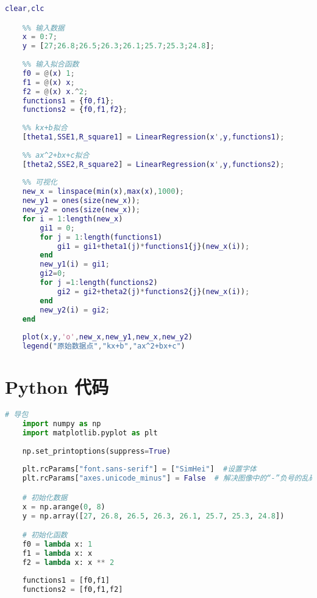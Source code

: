 \documentclass[withoutpreface]{cumcmthesis}
\begin{document}
    \begin{lstlisting}[language=matlab ,caption={一次函数和二次函数拟合比较} ]
    clear,clc

    %% 输入数据
    x = 0:7;
    y = [27;26.8;26.5;26.3;26.1;25.7;25.3;24.8];
    
    %% 输入拟合函数
    f0 = @(x) 1;
    f1 = @(x) x;
    f2 = @(x) x.^2;
    functions1 = {f0,f1};
    functions2 = {f0,f1,f2};
    
    %% kx+b拟合
    [theta1,SSE1,R_square1] = LinearRegression(x',y,functions1);
    
    %% ax^2+bx+c拟合
    [theta2,SSE2,R_square2] = LinearRegression(x',y,functions2);
    
    %% 可视化
    new_x = linspace(min(x),max(x),1000);
    new_y1 = ones(size(new_x));
    new_y2 = ones(size(new_x));
    for i = 1:length(new_x)
        gi1 = 0;
        for j = 1:length(functions1)
            gi1 = gi1+theta1(j)*functions1{j}(new_x(i));
        end
        new_y1(i) = gi1;
        gi2=0;
        for j =1:length(functions2)
            gi2 = gi2+theta2(j)*functions2{j}(new_x(i));
        end
        new_y2(i) = gi2;
    end
    
    plot(x,y,'o',new_x,new_y1,new_x,new_y2)
    legend("原始数据点","kx+b","ax^2+bx+c")
    \end{lstlisting}
\section{Python 代码}

    \begin{lstlisting}[language=python ,caption={初始化} ]
    # 导包
    import numpy as np
    import matplotlib.pyplot as plt
    
    np.set_printoptions(suppress=True)
    
    plt.rcParams["font.sans-serif"] = ["SimHei"]  #设置字体
    plt.rcParams["axes.unicode_minus"] = False  # 解决图像中的“-”负号的乱码问题

    # 初始化数据
    x = np.arange(0, 8)
    y = np.array([27, 26.8, 26.5, 26.3, 26.1, 25.7, 25.3, 24.8])

    # 初始化函数
    f0 = lambda x: 1
    f1 = lambda x: x
    f2 = lambda x: x ** 2
    
    functions1 = [f0,f1]
    functions2 = [f0,f1,f2]
    \end{lstlisting}
\end{document}
